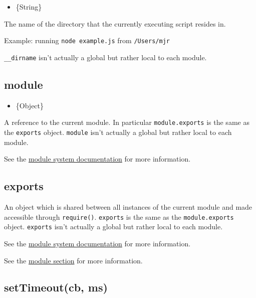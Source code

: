 \begin{itemize}
\item
  \{String\}
\end{itemize}

The name of the directory that the currently executing script resides
in.

Example: running \texttt{node example.js} from \texttt{/Users/mjr}

\begin{Shaded}
\begin{Highlighting}[]
\end{Highlighting}
\end{Shaded}

\texttt{\_\_dirname} isn't actually a global but rather local to each
module.

\subsection{module}

\begin{itemize}
\item
  \{Object\}
\end{itemize}

A reference to the current module. In particular \texttt{module.exports}
is the same as the \texttt{exports} object. \texttt{module} isn't
actually a global but rather local to each module.

See the \href{modules.html}{module system documentation} for more
information.

\subsection{exports}

An object which is shared between all instances of the current module
and made accessible through \texttt{require()}. \texttt{exports} is the
same as the \texttt{module.exports} object. \texttt{exports} isn't
actually a global but rather local to each module.

See the \href{modules.html}{module system documentation} for more
information.

See the \href{modules.html}{module section} for more information.

\subsection{setTimeout(cb, ms)}

